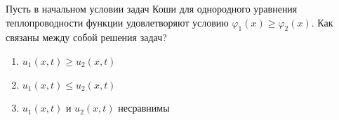 Пусть в начальном условии задач Коши для однородного уравнения теплопроводности функции удовлетворяют условию \(\varphi _1(x ) \geq \varphi _2(x)\). Как связаны между собой решения задач?

\begin{enumerate}[label=\arabic*)]
    \item \(u_1(x,t)\geq u_2(x,t)\)
    \item \(u_1\left(x,t\right)\leq u_2\left(x,t\right)\)
    \item \(u_1\left(x,t\right)\) и \(u_2(x,t)\) несравнимы
\end{enumerate}

